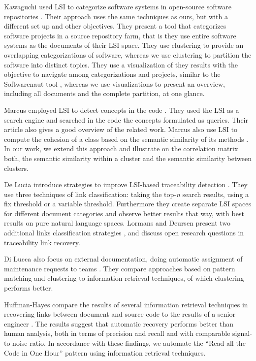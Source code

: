 Kawaguchi \etal used LSI to categorize software systems in open-source software repositories \cite{Kawa04a}. Their approach uses the same techniques as ours, but with a different set up and other objectives. They present a tool that categorizes software projects in a source repository farm, that is they use entire software systems as the documents of their LSI space. They use clustering to provide an overlapping categorizations of software, whereas we use clustering to partition the software into distinct topics. They use a visualization of they results with the objective to navigate among categorizations and projects, similar to the Softwarenaut tool \cite{Lung06a}, whereas we use visualizations to present an overview, including all documents and the complete partition, at one glance.

Marcus \etal employed LSI to detect concepts in the code \cite{Marc04a}. They used the LSI as a search engine and searched in the code the concepts formulated as queries. Their  article also gives a good overview of the related work. Marcus \etal also use LSI to compute the cohesion of a class based on the semantic similarity of its methods \cite{Marc05a}. In our work, we extend this approach and illustrate on the correlation matrix both, the semantic similarity within a cluster and the semantic similarity between clusters.

De Lucia \etal introduce strategies to improve LSI-based traceability detection \cite{Luci04a}. They use three techniques of link classification: taking the top-\emph{n} search results, using a fix threshold or a variable threshold. Furthermore they create separate LSI spaces for different document categories and observe better results that way, with best results on pure natural language spaces. Lormans and Deursen present two additional links classification strategies \cite{Lorm06a}, and discuss open research questions in traceability link recovery.

Di Lucca \etal also focus on external documentation, doing automatic assignment of maintenance requests to teams \cite{Lucc02b}. They compare approaches based on pattern matching and clustering to information retrieval techniques, of which clustering performs better.

Huffman-Hayes \etal compare the results of several information retrieval techniques in recovering links between document and source code to the results of a senior engineer \cite{Huff06a}. The results suggest that automatic recovery performs better than human analysis, both in terms of precision and recall and with comparable signal-to-noise ratio. In accordance with these findings, we automate the ``Read all the Code in One Hour'' pattern using information retrieval techniques.

